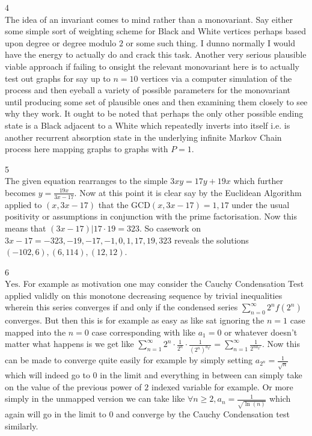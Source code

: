 4 \\
The idea of an invariant comes to mind rather than a monovariant. Say either some simple sort of weighting scheme for Black and White vertices perhaps based upon degree or degree modulo $2$ or some such thing. I dunno normally I would have the energy to actually do and crack this task. Another very serious plausible viable approach if failing to onsight the relevant monovariant here is to actually test out graphs for say up to $n = 10$ vertices via a computer simulation of the process and then eyeball a variety of possible parameters for the monovariant until producing some set of plausible ones and then examining them closely to see why they work. It ought to be noted that perhaps the only other possible ending state is a Black adjacent to a White which repeatedly inverts into itself i.e. is another recurrent absorption state in the underlying infinite Markov Chain process here mapping graphs to graphs with $P = 1$.

5 \\
The given equation rearranges to the simple $3xy = 17y + 19x$ which further becomes $y = \frac{19 x}{3 x - 17}$. Now at this point it is clear say by the Euclidean Algorithm applied to $(x , 3x - 17)$ that the $\text{GCD} (x , 3 x - 17) = 1 , 17$ under the usual positivity or assumptions in conjunction with the prime factorisation. Now this means that $(3 x - 17) | 17 \cdot 19 = 323$. So casework on $3 x - 17 = -323, -19, -17, -1, 0, 1, 17, 19, 323$ reveals the solutions $\boxed{(-102 , 6), (6, 114), (12, 12)}$.

6 \\
$\boxed{\text{Yes}}$. For example as motivation one may consider the Cauchy Condensation Test applied validly on this monotone decreasing sequence by trivial inequalities wherein this series converges if and only if the condensed series $\sum_{n = 0}^{\infty} 2^n f (2^n)$ converges. But then this is for example as easy as like sat ignoring the $n=1$ case mapped into the $n=0$ case corresponding with like $a_1 = 0$ or whatever doesn't matter what happens is we get like $\sum_{n = 1}^{\infty} 2^n \cdot \frac{1}{2^n} \cdot \frac{1}{(2^n)^{a_{2^n}}} = \sum_{n = 1}^{\infty} \frac{1}{2^{n a_{2^n}}}$. Now this can be made to converge quite easily for example by simply setting $a_{2^n} = \frac{1}{\sqrt{n}}$ which will indeed go to $0$ in the limit and everything in between can simply take on the value of the previous power of $2$ indexed variable for example. Or more simply in the unmapped version we can take like $\forall n \ge 2, a_n = \frac{1}{\sqrt{\ln(n)}}$ which again will go in the limit to $0$ and converge by the Cauchy Condensation test similarly.

